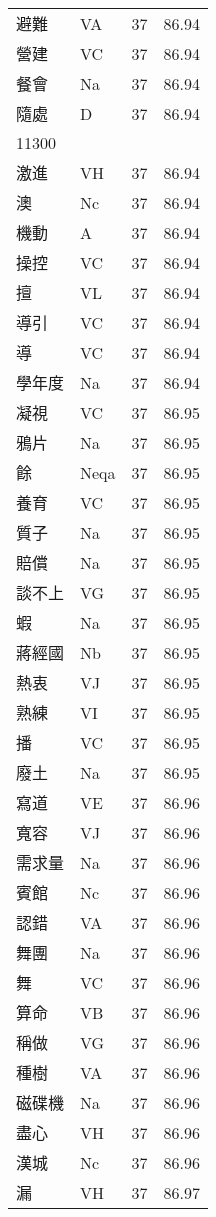 \documentclass[twocolumn]{book}
\begin{document}
\begin{supertabular}{llrr}
避難 & VA & 37 &  86.94\\
營建 & VC & 37 &  86.94\\
餐會 & Na & 37 &  86.94\\
隨處 & D & 37 &  86.94\\
11300\\
激進 & VH & 37 &  86.94\\
澳 & Nc & 37 &  86.94\\
機動 & A & 37 &  86.94\\
操控 & VC & 37 &  86.94\\
擅 & VL & 37 &  86.94\\
導引 & VC & 37 &  86.94\\
導 & VC & 37 &  86.94\\
學年度 & Na & 37 &  86.94\\
凝視 & VC & 37 &  86.95\\
鴉片 & Na & 37 &  86.95\\
餘 & Neqa & 37 &  86.95\\
養育 & VC & 37 &  86.95\\
質子 & Na & 37 &  86.95\\
賠償 & Na & 37 &  86.95\\
談不上 & VG & 37 &  86.95\\
蝦 & Na & 37 &  86.95\\
蔣經國 & Nb & 37 &  86.95\\
熱衷 & VJ & 37 &  86.95\\
熟練 & VI & 37 &  86.95\\
播 & VC & 37 &  86.95\\
廢土 & Na & 37 &  86.95\\
寫道 & VE & 37 &  86.96\\
寬容 & VJ & 37 &  86.96\\
需求量 & Na & 37 &  86.96\\
賓館 & Nc & 37 &  86.96\\
認錯 & VA & 37 &  86.96\\
舞團 & Na & 37 &  86.96\\
舞 & VC & 37 &  86.96\\
算命 & VB & 37 &  86.96\\
稱做 & VG & 37 &  86.96\\
種樹 & VA & 37 &  86.96\\
磁碟機 & Na & 37 &  86.96\\
盡心 & VH & 37 &  86.96\\
漢城 & Nc & 37 &  86.96\\
漏 & VH & 37 &  86.97\\

\end{supertabular}
\end{document}
